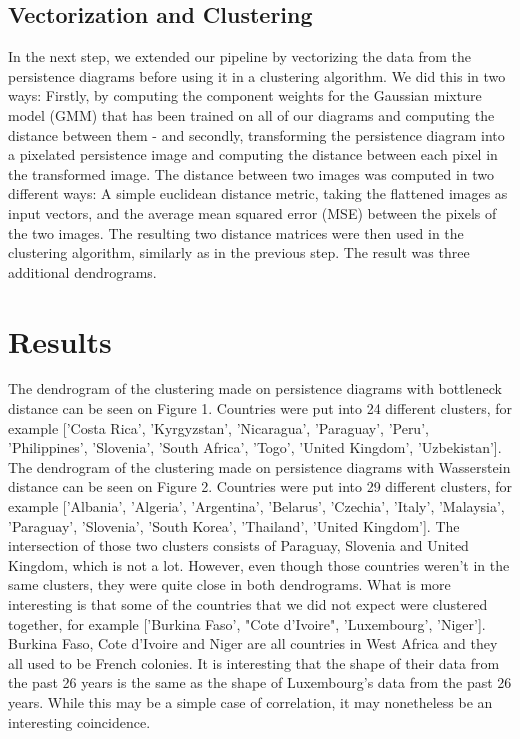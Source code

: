 \documentclass[12pt]{article}
\begin{document}
\subsection{Vectorization and Clustering}
In the next step, we extended our pipeline by vectorizing the data from the persistence diagrams before using it in a clustering algorithm. We did this in two ways: Firstly, by computing the component weights for the Gaussian mixture model (GMM) that has been trained on all of our diagrams and computing the distance between them - and secondly, transforming the persistence diagram into a pixelated persistence image and computing the distance between each pixel in the transformed image. The distance between two images was computed in two different ways: A simple euclidean distance metric, taking the flattened images as input vectors, and the average mean squared error (MSE) between the pixels of the two images. The resulting two distance matrices were then used in the clustering algorithm, similarly as in the previous step. The result was three additional dendrograms.

\section{Results}
The dendrogram of the clustering made on persistence diagrams with bottleneck distance can be seen on Figure 1. Countries were put into 24 different clusters, for example ['Costa Rica', 'Kyrgyzstan', 'Nicaragua', 'Paraguay', 'Peru', 'Philippines', 'Slovenia', 'South Africa', 'Togo', 'United Kingdom', 'Uzbekistan']. The dendrogram of the clustering made on persistence diagrams with Wasserstein distance can be seen on Figure 2. Countries were put into 29 different clusters, for example ['Albania', 'Algeria', 'Argentina', 'Belarus', 'Czechia', 'Italy', 'Malaysia', 'Paraguay', 'Slovenia', 'South Korea', 'Thailand', 'United Kingdom']. The intersection of those two clusters consists of  Paraguay, Slovenia and United Kingdom, which is not a lot. However, even though those countries weren't in the same clusters, they were quite close in both dendrograms. What is more interesting
is that some of the countries that we did not expect were clustered together, for example ['Burkina Faso', "Cote d'Ivoire", 'Luxembourg', 'Niger']. Burkina Faso, Cote d'Ivoire and Niger are all countries in West Africa and they all used to be French colonies. It is interesting that the shape of their data from the past 26 years is the same as the shape of Luxembourg's data from the past 26 years. While this may be a simple case of correlation, it may nonetheless be an interesting coincidence.
\end{document}
